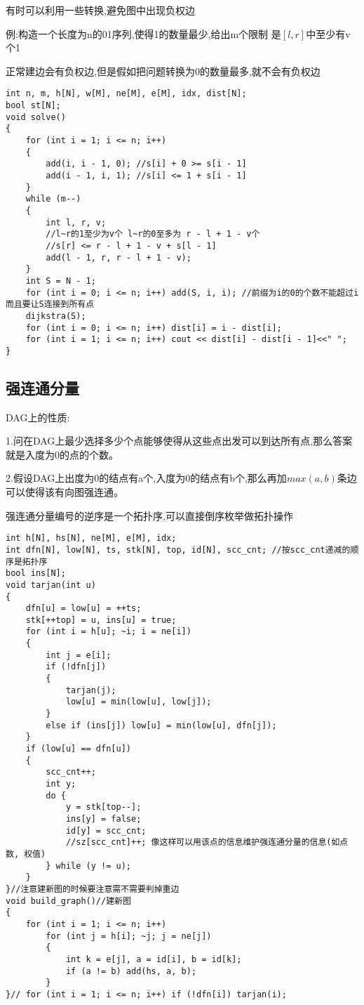 \documentclass[a4paper,fontset=none]{ctexart}
\begin{document}
有时可以利用一些转换,避免图中出现负权边

例:构造一个长度为n的01序列,使得1的数量最少,给出m个限制 是$[l,r]$中至少有v个1

正常建边会有负权边,但是假如把问题转换为0的数量最多,就不会有负权边

\begin{verbatim}
int n, m, h[N], w[M], ne[M], e[M], idx, dist[N];
bool st[N];
void solve()
{
    for (int i = 1; i <= n; i++)
    {
        add(i, i - 1, 0); //s[i] + 0 >= s[i - 1]
        add(i - 1, i, 1); //s[i] <= 1 + s[i - 1]
    }
    while (m--)
    {
        int l, r, v;
        //l~r的1至少为v个 l~r的0至多为 r - l + 1 - v个
        //s[r] <= r - l + 1 - v + s[l - 1]
        add(l - 1, r, r - l + 1 - v);
    }
    int S = N - 1;
    for (int i = 0; i <= n; i++) add(S, i, i); //前缀为i的0的个数不能超过i 而且要让S连接到所有点
    dijkstra(S);
    for (int i = 0; i <= n; i++) dist[i] = i - dist[i];
    for (int i = 1; i <= n; i++) cout << dist[i] - dist[i - 1]<<" ";
}
\end{verbatim}
\subsection{强连通分量}

DAG上的性质:

1.问在DAG上最少选择多少个点能够使得从这些点出发可以到达所有点,那么答案就是入度为0的点的个数。

2.假设DAG上出度为0的结点有a个,入度为0的结点有b个,那么再加$max(a,b)$条边可以使得该有向图强连通。

强连通分量编号的逆序是一个拓扑序,可以直接倒序枚举做拓扑操作

\begin{verbatim}
int h[N], hs[N], ne[M], e[M], idx;
int dfn[N], low[N], ts, stk[N], top, id[N], scc_cnt; //按scc_cnt递减的顺序是拓扑序
bool ins[N];
void tarjan(int u)
{
    dfn[u] = low[u] = ++ts;
    stk[++top] = u, ins[u] = true;
    for (int i = h[u]; ~i; i = ne[i])
    {
        int j = e[i];
        if (!dfn[j])
        {
            tarjan(j);
            low[u] = min(low[u], low[j]);
        }
        else if (ins[j]) low[u] = min(low[u], dfn[j]);
    }
    if (low[u] == dfn[u])
    {
        scc_cnt++;
        int y;
        do {
            y = stk[top--];
            ins[y] = false;
            id[y] = scc_cnt;
            //sz[scc_cnt]++; 像这样可以用该点的信息维护强连通分量的信息(如点数, 权值)
        } while (y != u);
    }
}//注意建新图的时候要注意需不需要判掉重边
void build_graph()//建新图
{
    for (int i = 1; i <= n; i++)
        for (int j = h[i]; ~j; j = ne[j])
        {
            int k = e[j], a = id[i], b = id[k];
            if (a != b) add(hs, a, b);
        }
}// for (int i = 1; i <= n; i++) if (!dfn[i]) tarjan(i);
\end{verbatim}
\end{document}
